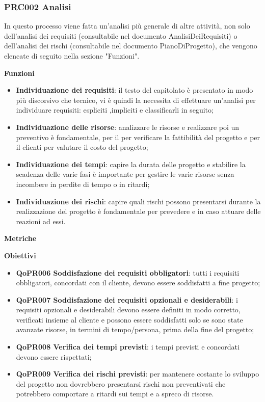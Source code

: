 \documentclass[../piano-di-qualifica.tex]{subfiles}
\begin{document}
\subsubsection{PRC002 Analisi}
\label{sub:analisi}
In questo processo viene fatta un'analisi più generale di altre attività, non solo dell'analisi dei requisiti (consultabile nel documento AnalisiDeiRequisiti) o dell'analisi dei rischi (consultabile nel documento PianoDiProgetto), che vengono elencate di seguito nella sezione "Funzioni".

\textbf{Funzioni}
\begin{itemize}
    \item \textbf{Individuazione dei requisiti}: il testo del capitolato è presentato in modo più discorsivo che tecnico, vi è quindi la necessita di effettuare un'analisi per individuare requisiti: espliciti ,impliciti e classificarli in seguito;
    \item \textbf{Individuazione delle risorse}: analizzare le risorse e realizzare poi un preventivo è fondamentale, per il  per verificare la fattibilità del progetto e per il clienti per valutare il costo del progetto;
    \item \textbf{Individuazione dei tempi}: capire la durata delle progetto e stabilire la scadenza delle varie fasi è importante per gestire le varie risorse senza incombere in perdite di tempo o in ritardi;
    \item \textbf{Individuazione dei rischi}: capire quali rischi possono presentarsi durante la realizzazione del progetto è fondamentale per prevedere e in caso attuare delle reazioni ad essi.
\end{itemize}

\textbf{Metriche}

\textbf{Obiettivi}
\begin{itemize}
    \item \textbf{QoPR006 Soddisfazione dei requisiti obbligatori}: tutti i requisiti obbligatori, concordati con il cliente, devono essere soddisfatti a fine progetto;
    \item \textbf{QoPR007 Soddisfazione dei requisiti opzionali e desiderabili}: i requisiti opzionali e desiderabili devono essere definiti in modo corretto, verificati insieme al cliente e possono essere soddisfatti solo se sono state avanzate risorse, in termini di tempo/persona, prima della fine del progetto;
    \item \textbf{QoPR008 Verifica dei tempi previsti}: i tempi previsti e concordati devono essere rispettati;
    \item \textbf{QoPR009 Verifica dei rischi previsti}: per mantenere costante lo sviluppo del progetto non dovrebbero presentarsi rischi non preventivati che potrebbero comportare a ritardi sui tempi e a spreco di risorse.
\end{itemize}
\end{document}

